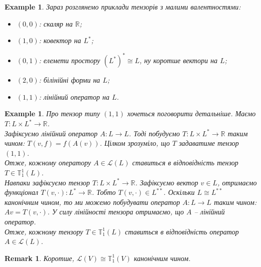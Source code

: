\documentclass[a4paper, 10pt]{article}
\theoremstyle{theoremdd}
\newtheorem{example}[theorem]{Example}
\newtheorem{remark}[theorem]{Remark}
\begin{document}
\begin{example}
Зараз розглянемо приклади тензорів з малими валентностями:
\begin{itemize}[nosep,wide=0pt,label={-}]
\item $(0,0)$: скаляр на $\mathbb{R}$;
\item $(1,0)$: ковектор на $L^*$;
\item $(0,1)$: елемети простору $(L^*)^* \cong L$, ну коротше вектори на $L$;
\item $(2,0)$: білінійні форми на $L$;
\item $(1,1)$: лінійний оператор на $L$.
\end{itemize}
\end{example}

\begin{example}
Про тензор типу $(1,1)$ хочеться поговорити детальніше. Маємо $T \colon L \times L^* \to \mathbb{R}$.\\
Зафіксуємо лінійний оператор $A \colon L \to L$. Тоді побудуємо $T \colon L \times L^* \to \mathbb{R}$ таким чином: $T(v,f) = f(A(v))$. Цілком зрозуміло, що $T$ задаватиме тензор $(1,1)$.\\
Отже, кожному оператору $A \in \mathcal{L}(L)$ ставиться в відповідність тензор $T \in \mathbb{T}_1^1(L)$.
\bigskip \\
Навпаки зафіксуємо тензор $T \colon L \times L^* \to \mathbb{R}$. Зафіксуємо вектор $v \in L$, отримаємо функціонал $T(v, \cdot) \colon L^* \to \mathbb{R}$. Тобто $T(v,\cdot) \in L^{**}$. Оскільки $L \cong L^{**}$ канонічним чином, то ми можемо побудувати оператор $A \colon L \to L$ таким чином: $Av = T(v,\cdot)$. У силу лінійності тензора отримаємо, що $A$ -- лінійний оператор.\\
Отже, кожному тензору $T \in \mathbb{T}^1_1(L)$ ставиться в відповідність оператор $A \in \mathcal{L}(L)$.
\end{example}

\begin{remark}
Коротше, $\mathcal{L}(V) \cong \mathbb{T}_1^1(V)$ канонічним чином.
\end{remark}
\end{document}
